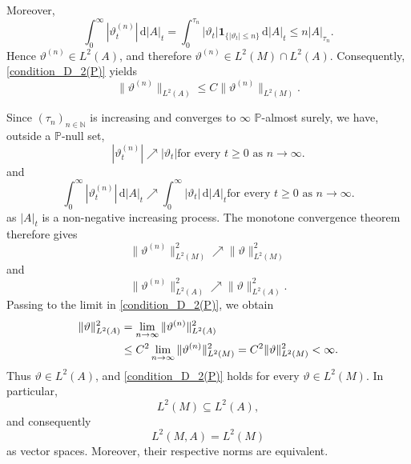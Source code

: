 \documentclass[11pt,a4paper,twoside,openany]{report}
\numberwithin{equation}{section}
\newcommand{\diff}{\mathrm{d}}
\theoremstyle{plain} %
\theoremstyle{definition} %
\theoremstyle{remark} %
\begin{document}
Moreover,
\begin{equation*}
    \int_0^\infty
    |\vartheta^{(n)}_t|\,\diff |A|_t
    =
    \int_0^{\tau_n}
    |\vartheta_t|
    \mathbf{1}_{\{|\vartheta_t|\leq n\}}\,\diff |A|_t\leq
    n|A|_{\tau_n}.
\end{equation*}
Hence \(\vartheta^{(n)}\in L^2(A)\), and therefore
\(\vartheta^{(n)}\in L^2(M)\cap L^2(A)\). Consequently,
\eqref{condition_D_2(P)} yields
\begin{equation*}
    \|\vartheta^{(n)}\|_{L^2(A)}
    \leq
    C\|\vartheta^{(n)}\|_{L^2(M)}.
\end{equation*}

Since \((\tau_n)_{n\in\mathbb{N}}\) is increasing and converges to
\(\infty\) \(\mathbb{P}\)-almost surely, we have, outside a \(\mathbb{P}\)-null set,
\begin{equation*}
    |\vartheta^{(n)}_t|
    \nearrow
    |\vartheta_t|
    \text{for every }t\geq 0\text{ as }n\to\infty.
\end{equation*}
and 
\begin{equation*}
    \int_0^\infty|\vartheta^{(n)}_t|\,\diff |A|_t
    \nearrow
    \int_0^\infty|\vartheta_t|\,\diff |A|_t
    \text{for every }t\geq 0\text{ as }n\to\infty.
\end{equation*}
as \(|A|_t\) is a non-negative increasing process.
The monotone convergence theorem therefore gives
\begin{equation*}
    \|\vartheta^{(n)}\|_{L^2(M)}^2
    \nearrow
    \|\vartheta\|_{L^2(M)}^2
\end{equation*}
and
\begin{equation*}
    \|\vartheta^{(n)}\|_{L^2(A)}^2
    \nearrow
    \|\vartheta\|_{L^2(A)}^2.
\end{equation*}
 Passing to the limit in
\eqref{condition_D_2(P)}, we obtain
\begin{align*}
    \|\vartheta\|_{L^2(A)}^2
    &=
    \lim_{n\to\infty}
    \|\vartheta^{(n)}\|_{L^2(A)}^2
    \notag\\
    &\leq
    C^2
    \lim_{n\to\infty}
    \|\vartheta^{(n)}\|_{L^2(M)}^2
    \notag=
    C^2\|\vartheta\|_{L^2(M)}^2
    <
    \infty.
\end{align*}
Thus \(\vartheta\in L^2(A)\), and
\eqref{condition_D_2(P)} holds for every
\(\vartheta\in L^2(M)\). In particular,
\begin{equation*}
    L^2(M)\subseteq L^2(A),
\end{equation*}
and consequently
\begin{equation*}
    L^2(M,A)=L^2(M)
\end{equation*}
as vector spaces. Moreover, their respective norms are equivalent.
\end{document}
